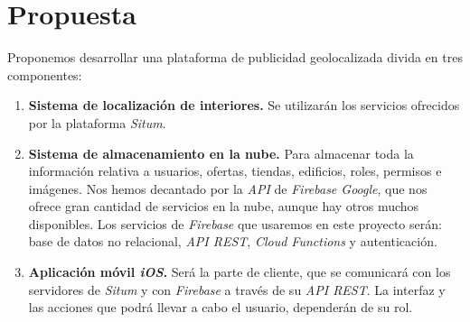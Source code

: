 \section{Propuesta}
Proponemos desarrollar una plataforma de publicidad geolocalizada  divida en tres componentes:
\begin{enumerate}
\item \textbf{Sistema de localización de interiores.} Se utilizarán los servicios ofrecidos por la plataforma \textit{Situm}.
\item \textbf{Sistema de almacenamiento en la nube.} Para almacenar toda la información relativa a usuarios, ofertas, tiendas, edificios, roles, permisos e imágenes. Nos hemos decantado por la \textit{API} de \textit{Firebase Google}, que nos ofrece gran cantidad de servicios en la nube, aunque hay otros muchos disponibles. Los servicios de \textit{Firebase} que usaremos en este proyecto serán: base de datos no relacional, \textit{API REST}, \textit{Cloud Functions} y autenticación. 
\item\textbf{ Aplicación móvil \textit{iOS}.} Será la parte de cliente, que se comunicará con los servidores de \textit{Situm} y con \textit{Firebase} a través de su \textit{API REST}. La interfaz y las acciones que podrá llevar a cabo el usuario, dependerán de su rol.
\end{enumerate}


